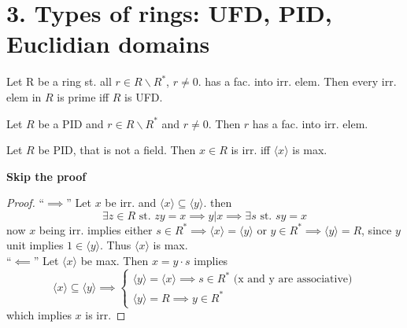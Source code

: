 \chapter*{3. Types of rings: UFD, PID, Euclidian domains}
\begin{proposition}
  Let R be a ring st. all $r \in R \backslash R^{*}$, $r \neq 0$. has a fac. into irr. elem. Then every irr. elem in $R$ is prime iff $R$ is UFD.
\end{proposition}


\begin{lemma}
  Let $R$ be a PID and $r \in R \backslash R^{*}$ and $r \neq 0$. Then $r$ has a fac. into irr. elem.
\end{lemma}


\begin{proposition}
  Let $R$ be PID, that is not a field. Then $x \in R$ is irr. iff $\langle x \rangle$ is max.
\end{proposition}
\textbf{Skip the proof}
\begin{proof}
  ``$\implies$'' Let $x$ be irr. and $\langle x \rangle \subseteq \langle y \rangle$. then
  \begin{equation*}
    \exists z \in R \text{ st. } zy = x \implies y | x \implies \exists s \text{ st. } sy = x
  \end{equation*}
  now $x$ being irr. implies either $s \in R^{*} \implies \langle x \rangle = \langle y \rangle$ or $y \in R^{*} \implies \langle y \rangle = R$, since $y$ unit implies $1 \in \langle y \rangle$.
  Thus $\langle x \rangle$ is max.\\
  ``$\impliedby$'' Let $\langle x \rangle$ be max. Then $x = y \cdot s$ implies
  \begin{equation*}
    \langle x \rangle \subseteq \langle y \rangle \implies \begin{cases} \langle y \rangle = \langle x \rangle \implies s \in R^{*} \text{ (x and y are associative)} \\ \langle y \rangle = R \implies y \in R^{*} \end{cases}
  \end{equation*}
  which implies $x$ is irr.
\end{proof}

